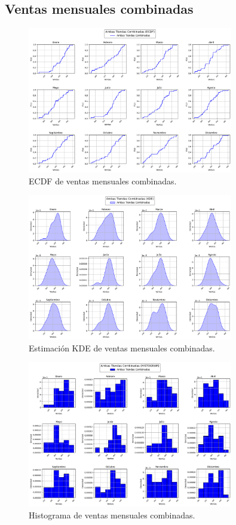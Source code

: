 \documentclass[12pt,a4paper]{article}
\begin{document}
\subsection{Ventas mensuales combinadas}
\begin{figure}[H]
  \centering
  \includegraphics[width=0.8\textwidth]{graphs/Combinado_ecdf_comparison.png}
  \caption{ECDF de ventas mensuales combinadas.}
\end{figure}
\begin{figure}[H]
  \centering
  \includegraphics[width=0.8\textwidth]{graphs/Combinado_kde_comparison.png}
  \caption{Estimación KDE de ventas mensuales combinadas.}
\end{figure}
\begin{figure}[H]
  \centering
  \includegraphics[width=0.8\textwidth]{graphs/Combinado_histogram_comparison.png}
  \caption{Histograma de ventas mensuales combinadas.}
\end{figure}
\end{document}
